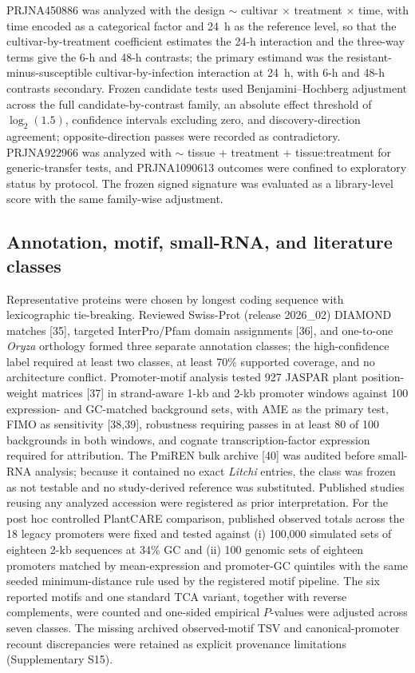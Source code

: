 \documentclass[11pt]{article}
\begin{document}
PRJNA450886 was analyzed with the design $\sim$ cultivar $\times$ treatment $\times$ time, with time encoded as a categorical factor and 24~h as the reference level, so that the cultivar-by-treatment coefficient estimates the 24-h interaction and the three-way terms give the 6-h and 48-h contrasts; the primary estimand was the resistant-minus-susceptible cultivar-by-infection interaction at 24~h, with 6-h and 48-h contrasts secondary. Frozen candidate tests used Benjamini--Hochberg adjustment across the full candidate-by-contrast family, an absolute effect threshold of $\log_2(1.5)$, confidence intervals excluding zero, and discovery-direction agreement; opposite-direction passes were recorded as contradictory. PRJNA922966 was analyzed with $\sim$ tissue + treatment + tissue:treatment for generic-transfer tests, and PRJNA1090613 outcomes were confined to exploratory status by protocol. The frozen signed signature was evaluated as a library-level score with the same family-wise adjustment.

\subsection{Annotation, motif, small-RNA, and literature classes}

Representative proteins were chosen by longest coding sequence with lexicographic tie-breaking. Reviewed Swiss-Prot (release 2026\_02) DIAMOND matches [35], targeted InterPro/Pfam domain assignments [36], and one-to-one \textit{Oryza} orthology formed three separate annotation classes; the high-confidence label required at least two classes, at least 70\% supported coverage, and no architecture conflict. Promoter-motif analysis tested 927 JASPAR plant position-weight matrices [37] in strand-aware 1-kb and 2-kb promoter windows against 100 expression- and GC-matched background sets, with AME as the primary test, FIMO as sensitivity [38,39], robustness requiring passes in at least 80 of 100 backgrounds in both windows, and cognate transcription-factor expression required for attribution. The PmiREN bulk archive [40] was audited before small-RNA analysis; because it contained no exact \textit{Litchi} entries, the class was frozen as not testable and no study-derived reference was substituted. Published studies reusing any analyzed accession were registered as prior interpretation. For the post hoc controlled PlantCARE comparison, published observed totals across the 18 legacy promoters were fixed and tested against (i) 100,000 simulated sets of eighteen 2-kb sequences at 34\% GC and (ii) 100 genomic sets of eighteen promoters matched by mean-expression and promoter-GC quintiles with the same seeded minimum-distance rule used by the registered motif pipeline. The six reported motifs and one standard TCA variant, together with reverse complements, were counted and one-sided empirical $P$-values were adjusted across seven classes. The missing archived observed-motif TSV and canonical-promoter recount discrepancies were retained as explicit provenance limitations (Supplementary S15).
\end{document}
